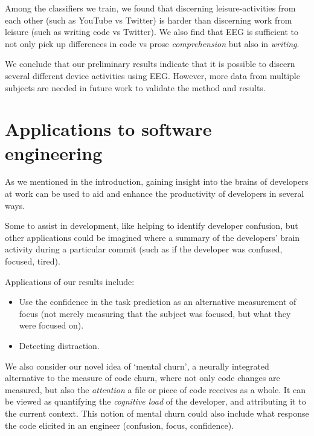 Among the classifiers we train, we found that discerning leisure-activities from each other (such as YouTube vs Twitter) is harder than discerning work from leisure (such as writing code vs Twitter). We also find that EEG is sufficient to not only pick up differences in code vs prose \emph{comprehension} but also in \emph{writing}.

We conclude that our preliminary results indicate that it is possible to discern several different device activities using EEG\@. However, more data from multiple subjects are needed in future work to validate the method and results. 

\section{Applications to software engineering}

As we mentioned in the introduction, gaining insight into the brains of developers at work can be used to aid and enhance the productivity of developers in several ways.

Some to assist in development, like helping to identify developer confusion, but other applications could be imagined where a summary of the developers' brain activity during a particular commit (such as if the developer was confused, focused, tired).


Applications of our results include:

\begin{itemize}
    \item Use the confidence in the task prediction as an alternative measurement of focus (not merely measuring that the subject was focused, but what they were focused on). 
    \item Detecting distraction.
\end{itemize}

We also consider our novel idea of `mental churn', a neurally integrated alternative to the measure of code churn, where not only code changes are measured, but also the \emph{attention} a file or piece of code receives as a whole. It can be viewed as quantifying the \emph{cognitive load} of the developer, and attributing it to the current context. This notion of mental churn could also include what response the code elicited in an engineer (confusion, focus, confidence).

